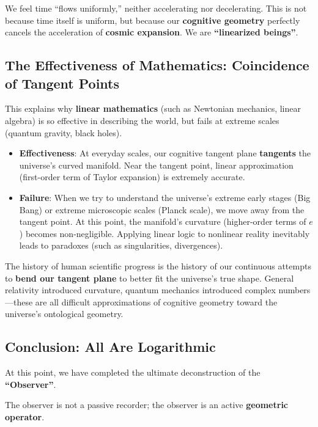 We feel time ``flows uniformly,'' neither accelerating nor decelerating. This is not because time itself is uniform, but because our \textbf{cognitive geometry} perfectly cancels the acceleration of \textbf{cosmic expansion}. We are \textbf{``linearized beings''}.

\subsection{The Effectiveness of Mathematics: Coincidence of Tangent Points}

This explains why \textbf{linear mathematics} (such as Newtonian mechanics, linear algebra) is so effective in describing the world, but fails at extreme scales (quantum gravity, black holes).

\begin{itemize}
\item \textbf{Effectiveness}: At everyday scales, our cognitive tangent plane \textbf{tangents} the universe's curved manifold. Near the tangent point, linear approximation (first-order term of Taylor expansion) is extremely accurate.

\item \textbf{Failure}: When we try to understand the universe's extreme early stages (Big Bang) or extreme microscopic scales (Planck scale), we move away from the tangent point. At this point, the manifold's curvature (higher-order terms of $e$) becomes non-negligible. Applying linear logic to nonlinear reality inevitably leads to paradoxes (such as singularities, divergences).
\end{itemize}

The history of human scientific progress is the history of our continuous attempts to \textbf{bend our tangent plane} to better fit the universe's true shape. General relativity introduced curvature, quantum mechanics introduced complex numbers---these are all difficult approximations of cognitive geometry toward the universe's ontological geometry.

\subsection{Conclusion: All Are Logarithmic}

At this point, we have completed the ultimate deconstruction of the \textbf{``Observer''}.

The observer is not a passive recorder; the observer is an active \textbf{geometric operator}.

